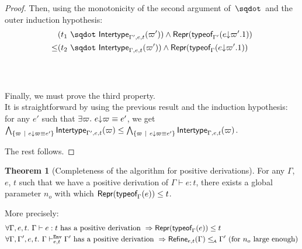 \documentclass[a4paper]{article}
\theoremstyle{definition}
\newtheorem{theorem}{Theorem}
\begin{document}
\begin{proof}
  Then, using the monotonicity of the second argument of $\worra {}{}$ and the outer induction hypothesis:
  \begin{align*}
    &(\worra {t_1} {\env {\Gamma',e,t} (\varpi')}) \land \tsrep {\tyof {\occ e {\varpi'.1}} {\Gamma'}}\\
    \leq &(\worra {t_2} {\env {\Gamma,e,t} (\varpi')}) \land \tsrep {\tyof {\occ e {\varpi'.1}} {\Gamma}}
  \end{align*}
  \\

  \ 

  Finally, we must prove the third property.\\
  It is straightforward by using the previous result and the induction hypothesis:\\
  for any $e'$ such that $\exists \varpi.\ e{\downarrow}\varpi \equiv e'$, we get
  $\bigwedge_{\{\varpi~|~ e{\downarrow}\varpi \equiv e'\}} \textsf{Intertype}_{\Gamma',e,t} (\varpi) \leq \bigwedge_{\{\varpi~|~ e{\downarrow}\varpi \equiv e'\}} \textsf{Intertype}_{\Gamma,e,t} (\varpi)$.

  The rest follows.
  \end{proof}

  \begin{theorem}[Completeness of the algorithm for positive derivations]
    For any $\Gamma$, $e$, $t$ such that we have a positive derivation of $\Gamma \vdash e:t$,
    there exists a global parameter $n_o$ with which $\textsf{Repr}(\textsf{typeof}_{\Gamma}(e)) \leq t$.

    More precisely:
    \begin{align*}
      &\forall \Gamma, e, t.\ \Gamma \vdash e:t \text{ has a positive derivation } \Rightarrow \textsf{Repr}(\textsf{typeof}_{\Gamma}(e)) \leq t\\
      &\forall \Gamma, \Gamma', e, t.\ \Gamma \vdash^{\texttt{Env}}_{e,t} \Gamma' \text{ has a positive derivation } \Rightarrow \textsf{Refine}_{e,t}(\Gamma) \leq_{\!\scriptscriptstyle\mathcal{A}} \Gamma' \text{ (for $n_o$ large enough)}
    \end{align*}
  \end{theorem}
\end{document}
